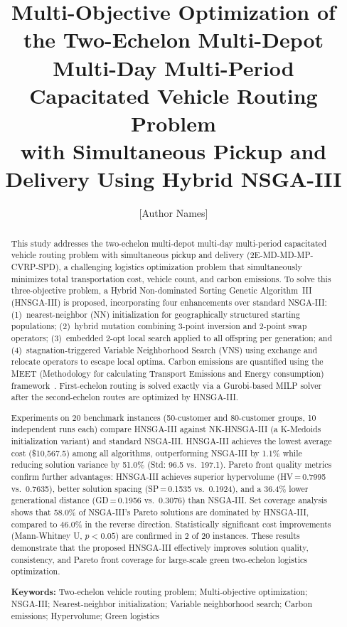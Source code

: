 \documentclass[11pt, a4paper]{article}
\title{\textbf{Multi-Objective Optimization of the Two-Echelon Multi-Depot\\
Multi-Day Multi-Period Capacitated Vehicle Routing Problem\\
with Simultaneous Pickup and Delivery Using Hybrid NSGA-III}}
\author{[Author Names]}
\date{}
\numberwithin{equation}{section}
\begin{document}
\maketitle
\thispagestyle{fancy}

\begin{abstract}
This study addresses the two-echelon multi-depot multi-day multi-period
capacitated vehicle routing problem with simultaneous pickup and delivery
(2E-MD-MD-MP-CVRP-SPD), a challenging logistics optimization problem that
simultaneously minimizes total transportation cost, vehicle count, and carbon
emissions.  To solve this three-objective problem, a Hybrid Non-dominated
Sorting Genetic Algorithm~III (HNSGA-III) is proposed, incorporating four
enhancements over standard NSGA-III: (1)~nearest-neighbor (NN) initialization
for geographically structured starting populations; (2)~hybrid mutation
combining 3-point inversion and 2-point swap operators; (3)~embedded 2-opt
local search applied to all offspring per generation; and (4)~stagnation-triggered
Variable Neighborhood Search (VNS) using exchange and relocate operators to
escape local optima.  Carbon emissions are quantified using the MEET
(Methodology for calculating Transport Emissions and Energy consumption)
framework~\cite{hickman1999}.  First-echelon routing is solved exactly via a
Gurobi-based MILP solver after the second-echelon routes are optimized by
HNSGA-III.

Experiments on 20 benchmark instances (50-customer and 80-customer groups,
10 independent runs each) compare HNSGA-III against NK-HNSGA-III (a K-Medoids
initialization variant) and standard NSGA-III\@.  HNSGA-III achieves the lowest
average cost (\$10{,}567.5) among all algorithms, outperforming NSGA-III by
1.1\% while reducing solution variance by 51.0\% (Std: 96.5 vs.\ 197.1).
Pareto front quality metrics confirm further advantages: HNSGA-III achieves
superior hypervolume (HV\,=\,0.7995 vs.\ 0.7635), better solution spacing
(SP\,=\,0.1535 vs.\ 0.1924), and a 36.4\% lower generational distance
(GD\,=\,0.1956 vs.\ 0.3076) than NSGA-III\@.  Set coverage analysis shows
that 58.0\% of NSGA-III's Pareto solutions are dominated by HNSGA-III,
compared to 46.0\% in the reverse direction.  Statistically significant cost
improvements (Mann-Whitney U, $p<0.05$) are confirmed in 2 of 20 instances.
These results demonstrate that the proposed HNSGA-III effectively improves
solution quality, consistency, and Pareto front coverage for large-scale green
two-echelon logistics optimization.

\medskip
\noindent\textbf{Keywords:} Two-echelon vehicle routing problem;
Multi-objective optimization; NSGA-III; Nearest-neighbor initialization;
Variable neighborhood search; Carbon emissions; Hypervolume; Green logistics
\end{abstract}
\end{document}
